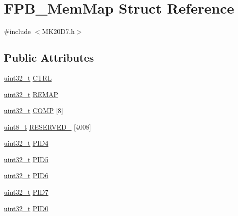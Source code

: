 \hypertarget{struct_f_p_b___mem_map}{}\section{F\+P\+B\+\_\+\+Mem\+Map Struct Reference}
\label{struct_f_p_b___mem_map}


{\ttfamily \#include $<$M\+K20\+D7.\+h$>$}

\subsection*{Public Attributes}
\begin{DoxyCompactItemize}
\item 
\hyperlink{_p_e___types_8h_a33594304e786b158f3fb30289278f5af}{uint32\+\_\+t} \hyperlink{struct_f_p_b___mem_map_a121a2d8da37c6ebf48cb82cedc2c2be7}{C\+T\+RL}
\item 
\hyperlink{_p_e___types_8h_a33594304e786b158f3fb30289278f5af}{uint32\+\_\+t} \hyperlink{struct_f_p_b___mem_map_acdaa312f2de037db4f203b9cfd303772}{R\+E\+M\+AP}
\item 
\hyperlink{_p_e___types_8h_a33594304e786b158f3fb30289278f5af}{uint32\+\_\+t} \hyperlink{struct_f_p_b___mem_map_af211a1d0517eee3b95fe6d8453332490}{C\+O\+MP} \mbox{[}8\mbox{]}
\item 
\hyperlink{_p_e___types_8h_aba7bc1797add20fe3efdf37ced1182c5}{uint8\+\_\+t} \hyperlink{struct_f_p_b___mem_map_ab84652bcc7513fd0d7cb7800d0de0a7d}{R\+E\+S\+E\+R\+V\+E\+D\+\_} \mbox{[}4008\mbox{]}
\item 
\hyperlink{_p_e___types_8h_a33594304e786b158f3fb30289278f5af}{uint32\+\_\+t} \hyperlink{struct_f_p_b___mem_map_a4c24f21441de38f5d96099cf78723401}{P\+I\+D4}
\item 
\hyperlink{_p_e___types_8h_a33594304e786b158f3fb30289278f5af}{uint32\+\_\+t} \hyperlink{struct_f_p_b___mem_map_a695321526b4704fe0e93fe59e4c88cce}{P\+I\+D5}
\item 
\hyperlink{_p_e___types_8h_a33594304e786b158f3fb30289278f5af}{uint32\+\_\+t} \hyperlink{struct_f_p_b___mem_map_a0b39a99cbc5776452682f777ac30b44e}{P\+I\+D6}
\item 
\hyperlink{_p_e___types_8h_a33594304e786b158f3fb30289278f5af}{uint32\+\_\+t} \hyperlink{struct_f_p_b___mem_map_afa51ab59e5a495de076915024e3e6adf}{P\+I\+D7}
\item 
\hyperlink{_p_e___types_8h_a33594304e786b158f3fb30289278f5af}{uint32\+\_\+t} \hyperlink{struct_f_p_b___mem_map_aa60cb9ab44ceaaee9f7487d64144c1d8}{P\+I\+D0}

\end{DoxyCompactItemize}
